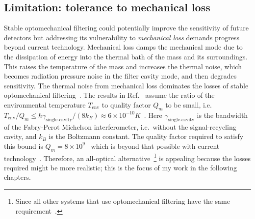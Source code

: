 \subsection{Limitation: tolerance to mechanical loss}
\label{sec:sWLC_loss}

Stable optomechanical filtering could potentially improve the sensitivity of future detectors but addressing its vulnerability to \emph{mechanical loss} demands progress beyond current technology. Mechanical loss damps the mechanical mode due to the dissipation of energy into the thermal bath of the mass and its surroundings. This raises the temperature of the mass and increases the thermal noise, which becomes radiation pressure noise in the filter cavity mode, and then degrades sensitivity. The thermal noise from mechanical loss dominates the losses of stable optomechanical filtering~\cite{liBroadbandSensitivityImprovement2020}. The results in Ref.~\cite{liBroadbandSensitivityImprovement2020} assume the ratio of the environmental temperature $T_\text{env}$ to quality factor $Q_m$ to be small, i.e.\
$T_\text{env}/Q_m\leq \hbar \gamma_\text{single-cavity}/(8 k_B) \approx 6\times 10^{-10}K$~\cite{miaoEnhancingBandwidthGravitationalWave2015}.
Here $\gamma_\text{single-cavity}$ is the bandwidth of the Fabry-Perot Michelson interferometer, i.e.\ without the signal-recycling cavity, and $k_B$ is the Boltzmann constant.
The quality factor required to satisfy this bound is $Q_m=8\times10^9$~\cite{miaoEnhancingBandwidthGravitationalWave2015} which is beyond that possible with current technology~\cite{masonetal2019,pageEnhancedDetectionHigh2018}. %
Therefore, an all-optical alternative~\footnote{Since all other systems that use optomechanical filtering have the same requirement~\cite{miaoEnhancingBandwidthGravitationalWave2015}.} is appealing because the losses required might be more realistic; this is the focus of my work in the following chapters.


